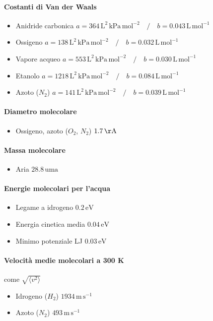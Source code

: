 \documentclass[10pt, oneside]{book}
\begin{document}
\paragraph{Costanti di Van der Waals}
\begin{itemize}
\item Anidride carbonica \dotfill $a = 364 \, \mathrm{L^2 \, kPa \, mol^{-2}} \quad \big/ \quad b = 0.043 \, \mathrm{L \, mol^{-1}}$ 
\item Ossigeno \dotfill $a = 138 \, \mathrm{L^2 \, kPa \, mol^{-2}} \quad \big/ \quad b = 0.032 \, \mathrm{L \, mol^{-1}}$ 
\item Vapore acqueo \dotfill $a = 553 \, \mathrm{L^2 \, kPa \, mol^{-2}} \quad \big/ \quad b = 0.030 \, \mathrm{L \, mol^{-1}}$ 
\item Etanolo \dotfill $a = 1218 \, \mathrm{L^2 \, kPa \, mol^{-2}} \quad \big/ \quad b = 0.084 \, \mathrm{L \, mol^{-1}}$ 
\item Azoto ($N_2$) \dotfill $a = 141 \, \mathrm{L^2 \, kPa \, mol^{-2}} \quad \big/ \quad b = 0.039 \, \mathrm{L \, mol^{-1}}$ 
\end{itemize}
\paragraph{Diametro molecolare}
\begin{itemize}
\item Ossigeno, azoto ($O_2$, $N_2$) \dotfill $ 1.7 \, \mathrm{\AA}$ 
\end{itemize}
\paragraph{Massa molecolare}
\begin{itemize}
\item Aria \dotfill $ 28.8 \, \mathrm{uma}$
\end{itemize}
\paragraph{Energie molecolari per l'acqua}
\begin{itemize}
\item Legame a idrogeno \dotfill $ 0.2 \, \mathrm{eV}$
\item Energia cinetica media \dotfill $ 0.04 \, \mathrm{eV}$
\item Minimo potenziale LJ \dotfill $ 0.03 \, \mathrm{eV}$

\end{itemize}
\paragraph{Velocità medie molecolari a 300 K} come $\displaystyle \sqrt{\langle v^2 \rangle}$
\begin{itemize}
\item Idrogeno ($H_2$) \dotfill $ 1934 \, \mathrm{m \, s^{-1}}$ 
\item Azoto ($N_2$) \dotfill $ 493 \, \mathrm{m \, s^{-1}}$ 
\end{itemize}
\end{document}
